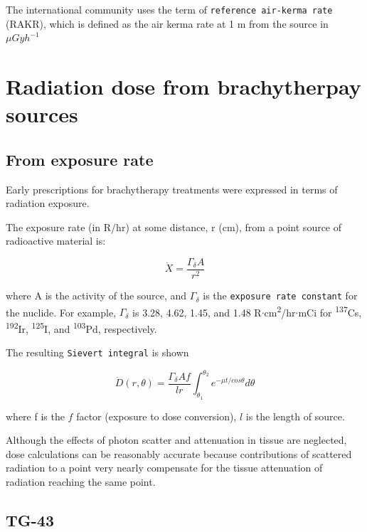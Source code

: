 \documentclass[]{book}
\theoremstyle{definition}
\theoremstyle{definition}
\theoremstyle{definition}
\theoremstyle{remark}
\begin{document}
The international community uses the term of
\texttt{reference\ air-kerma\ rate} (RAKR), which is defined as the air
kerma rate at 1 m from the source in \(\mu Gy h^{-1}\)

\section{Radiation dose from brachytherpay
sources}\label{radiation-dose-from-brachytherpay-sources}

\subsection{From exposure rate}\label{from-exposure-rate}

Early prescriptions for brachytherapy treatments were expressed in terms
of radiation exposure.

The exposure rate (in R/hr) at some distance, r (cm), from a point
source of radioactive material is:

\begin{equation}
   \dot X = \frac{\Gamma_{\delta}A}{r^2}
   \label{eq:exposure}
\end{equation}

where A is the activity of the source, and \(\Gamma_{\delta}\) is the
\texttt{exposure\ rate\ constant} for the nuclide. For example,
\(\Gamma_{\delta}\) is 3.28, 4.62, 1.45, and 1.48
R\(\cdot\)cm\textsuperscript{2}/hr\(\cdot\)mCi for
\textsuperscript{137}Cs, \textsuperscript{192}Ir,
\textsuperscript{125}I, and \textsuperscript{103}Pd, respectively.

The resulting \texttt{Sievert\ integral} is shown

\begin{equation}
   \dot D(r, \theta) = \frac{\Gamma_{\delta}Af}{lr}\int^{\theta_2}_{\theta_1}e^{-\mu t/cos{\theta}}d\theta
\end{equation}

where f is the \(f\) factor (exposure to dose conversion), \(l\) is the
length of source.

Although the effects of photon scatter and attenuation in tissue are
neglected, dose calculations can be reasonably accurate because
contributions of scattered radiation to a point very nearly compensate
for the tissue attenuation of radiation reaching the same point.

\subsection{TG-43}\label{tg43}
\end{document}

